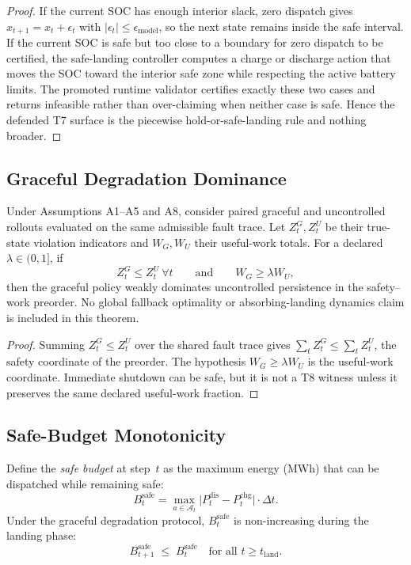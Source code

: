 \begin{proof}
If the current SOC has enough interior slack, zero dispatch gives
$x_{t+1}=x_t+\epsilon_t$ with $|\epsilon_t|\le\epsilon_{\text{model}}$, so the
next state remains inside the safe interval.  If the current SOC is safe but
too close to a boundary for zero dispatch to be certified, the safe-landing
controller computes a charge or discharge action that moves the SOC toward the
interior safe zone while respecting the active battery limits.  The promoted
runtime validator certifies exactly these two cases and returns infeasible
rather than over-claiming when neither case is safe.  Hence the defended T7
surface is the piecewise hold-or-safe-landing rule and nothing broader.
\end{proof}

\subsection{Graceful Degradation Dominance}

\begin{theorem}
\label{thm:graceful-dominance}
Under Assumptions A1--A5 and A8, consider paired graceful and uncontrolled
rollouts evaluated on the same admissible fault trace. Let \(Z_t^G,Z_t^U\) be
their true-state violation indicators and \(W_G,W_U\) their useful-work totals.
For a declared \(\lambda\in(0,1]\), if
\[
  Z_t^G\le Z_t^U\ \forall t
  \qquad\text{and}\qquad
  W_G\ge\lambda W_U,
\]
then the graceful policy weakly dominates uncontrolled persistence in the
safety--work preorder. No global fallback optimality or absorbing-landing
dynamics claim is included in this theorem.
\end{theorem}

\begin{proof}
Summing \(Z_t^G\le Z_t^U\) over the shared fault trace gives
\(\sum_t Z_t^G\le\sum_t Z_t^U\), the safety coordinate of the preorder.  The
hypothesis \(W_G\ge\lambda W_U\) is the useful-work coordinate.  Immediate
shutdown can be safe, but it is not a T8 witness unless it preserves the same
declared useful-work fraction.
\end{proof}

\subsection{Safe-Budget Monotonicity}

\begin{proposition}
\label{prop:budget-monotonicity}
Define the \emph{safe budget} at step~$t$ as the maximum energy
(MWh) that can be dispatched while remaining safe:
\[
  B_t^{\text{safe}} = \max_{a \in \mathcal{A}_t}
  \bigl|P_t^{\text{dis}} - P_t^{\text{chg}}\bigr| \cdot \Delta t.
\]
Under the graceful degradation protocol,
$B_t^{\text{safe}}$ is non-increasing during the landing phase:
\[
  B_{t+1}^{\text{safe}} \;\le\; B_t^{\text{safe}}
  \quad\text{for all } t \ge t_{\text{land}}.
\]
\end{proposition}

